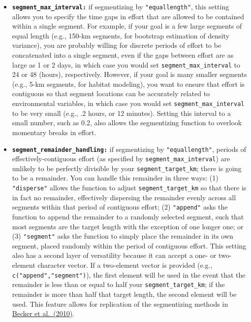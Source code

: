\documentclass[
]{book}
\begin{document}
\begin{itemize}
\item
  \textbf{\texttt{segment\_max\_interval:}} if segmentizing by \texttt{"equallength"}, this setting allows you to specify the time gaps in effort that are allowed to be contained within a single segment. For example, if your goal is a few large segments of equal length (e.g., 150-km segments, for bootstrap estimation of density variance), you are probably willing for discrete periods of effort to be concatenated into a single segment, even if the gaps between effort are as large as 1 or 2 days, in which case you would set \texttt{segment\_max\_interval} to 24 or 48 (hours), respectively. However, if your goal is many smaller segments (e.g., 5-km segments, for habitat modeling), you want to ensure that effort is contiguous so that segment locations can be accurately related to environmental variables, in which case you would set \texttt{segment\_max\_interval} to be very small (e.g., .2 hours, or 12 minutes). Setting this interval to a small number, such as 0.2, also allows the segmentizing function to overlook momentary breaks in effort.
\item
  \textbf{\texttt{segment\_remainder\_handling:}} if segmentizing by \texttt{"equallength"}, periods of effectively-contiguous effort (as specified by \texttt{segment\_max\_interval}) are unlikely to be perfectly divisible by your \texttt{segment\_target\_km}; there is going to be a remainder. You can handle this remainder in three ways: (1) \texttt{"disperse"} allows the function to adjust \texttt{segment\_target\_km} so that there is in fact no remainder, effectively dispersing the remainder evenly across all segments within that period of contiguous effort; (2) \texttt{"append"} asks the function to append the remainder to a randomly selected segment, such that most segments are the target length with the exception of one longer one; or (3) \texttt{"segment"} asks the function to simply place the remainder in its own segment, placed randomly within the period of contiguous effort. This setting also has a second layer of versatility because it can accept a one- or two-element character vector. If a two-element vector is provided (e.g., \texttt{c("append","segment")}), the first element will be used in the event that the remainder is less than or equal to half your \texttt{segment\_target\_km}; if the remainder is more than half that target length, the second element will be used. This feature allows for replication of the segmentizing methods in \href{https://www.int-res.com/abstracts/meps/v413/p163-183/}{Becker et al.~(2010)}.
\end{itemize}
\end{document}
